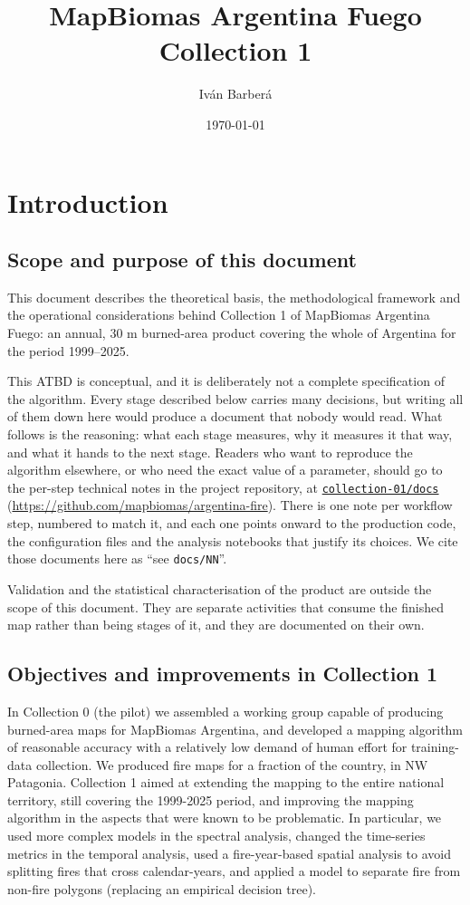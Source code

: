 \documentclass[11pt,a4paper]{article}
\title{MapBiomas Argentina Fuego \\ \large Collection 1}
\author{Iván Barberá}
\date{\today}
\begin{document}


\tableofcontents

\newpage

\section{Introduction}

\subsection{Scope and purpose of this document}

This document describes the theoretical basis, the methodological framework and the operational
considerations behind Collection 1 of MapBiomas Argentina Fuego: an annual, 30 m burned-area
product covering the whole of Argentina for the period 1999--2025.

This ATBD is conceptual, and it is deliberately not a complete specification of the algorithm.
Every stage described below carries many decisions, 
but writing all of them down here would produce a document 
that nobody would read. What follows is the reasoning: what each stage measures,
why it measures it that way, and what it hands to the next stage. Readers who want to reproduce
the algorithm elsewhere, or who need the exact value of a parameter, should go to the per-step
technical notes in the project repository, at
\href{https://github.com/mapbiomas/argentina-fire/tree/main/collection-01/docs}{\texttt{collection-01/docs}}
(\url{https://github.com/mapbiomas/argentina-fire}). There is one note per workflow
step, numbered to match it, and each one points onward to the production code, the configuration
files and the analysis notebooks that justify its choices. We cite those documents here as
\enquote{see \texttt{docs/NN}}.

Validation and the statistical characterisation of the product are outside the scope of this
document. They are separate activities that consume the finished map rather than being stages of
it, and they are documented on their own.

\subsection{Objectives and improvements in Collection 1}

In Collection 0 (the pilot) we assembled a working group capable of producing burned-area maps for
MapBiomas Argentina, and developed a mapping algorithm of reasonable accuracy with a relatively
low demand of human effort for training-data collection. We produced fire maps for a fraction of the
country, in NW Patagonia. Collection 1 aimed at extending the mapping to the entire national territory,
still covering the 1999-2025 period,
and improving the mapping algorithm in the aspects that were known to be problematic. In particular, 
we used more complex models in the spectral analysis, changed the time-series metrics in the temporal
analysis, used a fire-year-based spatial analysis to avoid splitting fires that cross calendar-years, 
and applied a model to separate fire from non-fire polygons (replacing an empirical decision tree).
\end{document}
